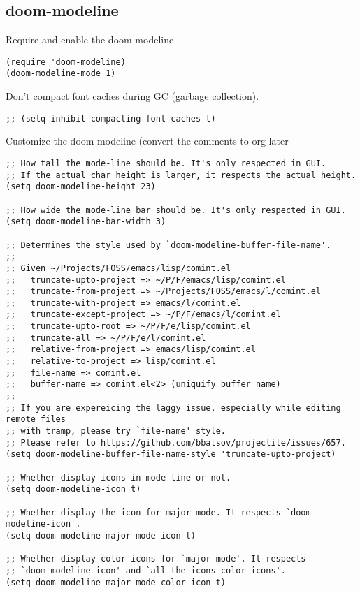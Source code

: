 \documentclass[11pt]{article}
\begin{document}
\subsection*{doom-modeline}
\label{sec:orgd04c7cf}

Require and enable the doom-modeline
\begin{verbatim}
(require 'doom-modeline)
(doom-modeline-mode 1)
\end{verbatim}

Don’t compact font caches during GC (garbage collection). 
\begin{verbatim}
;; (setq inhibit-compacting-font-caches t)
\end{verbatim}

Customize the doom-modeline (convert the comments to org later

\begin{verbatim}
;; How tall the mode-line should be. It's only respected in GUI.
;; If the actual char height is larger, it respects the actual height.
(setq doom-modeline-height 23)

;; How wide the mode-line bar should be. It's only respected in GUI.
(setq doom-modeline-bar-width 3)

;; Determines the style used by `doom-modeline-buffer-file-name'.
;;
;; Given ~/Projects/FOSS/emacs/lisp/comint.el
;;   truncate-upto-project => ~/P/F/emacs/lisp/comint.el
;;   truncate-from-project => ~/Projects/FOSS/emacs/l/comint.el
;;   truncate-with-project => emacs/l/comint.el
;;   truncate-except-project => ~/P/F/emacs/l/comint.el
;;   truncate-upto-root => ~/P/F/e/lisp/comint.el
;;   truncate-all => ~/P/F/e/l/comint.el
;;   relative-from-project => emacs/lisp/comint.el
;;   relative-to-project => lisp/comint.el
;;   file-name => comint.el
;;   buffer-name => comint.el<2> (uniquify buffer name)
;;
;; If you are expereicing the laggy issue, especially while editing remote files
;; with tramp, please try `file-name' style.
;; Please refer to https://github.com/bbatsov/projectile/issues/657.
(setq doom-modeline-buffer-file-name-style 'truncate-upto-project)

;; Whether display icons in mode-line or not.
(setq doom-modeline-icon t)

;; Whether display the icon for major mode. It respects `doom-modeline-icon'.
(setq doom-modeline-major-mode-icon t)

;; Whether display color icons for `major-mode'. It respects
;; `doom-modeline-icon' and `all-the-icons-color-icons'.
(setq doom-modeline-major-mode-color-icon t)


\end{verbatim}
\end{document}
